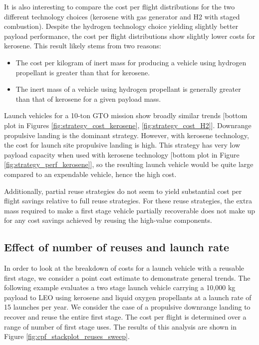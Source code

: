 \documentclass[conf]{new-aiaa}
\begin{document}
\begin{multicols}{2}
It is also interesting to compare the cost per flight distributions for the two different technology choices (kerosene with gas generator and H2 with staged combustion). Despite the hydrogen technology choice yielding slightly better payload performance, the cost per flight distributions show slightly lower costs for kerosene. This result likely stems from two reasons:

\begin{itemize}
  \item The cost per kilogram of inert mass for producing a vehicle using hydrogen propellant is greater than that for kerosene. 
  \item The inert mass of a vehicle using hydrogen propellant is generally greater than that of kerosene for a given payload mass.
\end{itemize}

Launch vehicles for a 10-ton GTO mission show broadly similar trends [bottom plot in Figures \ref{fig:strategy_cost_kerosene}, \ref{fig:strategy_cost_H2}]. Downrange propulsive landing is the dominant strategy. However, with kerosene technology, the cost for launch site propulsive landing is high. This strategy has very low payload capacity when used with kerosene technology [bottom plot in Figure \ref{fig:strategy_perf_kerosene}], so the resulting launch vehicle would be quite large compared to an expendable vehicle, hence the high cost.

Additionally, partial reuse strategies do not seem to yield substantial cost per flight savings relative to full reuse strategies. For these reuse strategies, the extra mass required to make a first stage vehicle partially recoverable does not make up for any cost savings achieved by reusing the high-value components. 


\subsection{Effect of number of reuses and launch rate}
In order to look at the breakdown of costs for a launch vehicle with a reusable first stage, we consider a point cost estimate to demonstrate general trends. The following example evaluates a two stage launch vehicle carrying a 10,000 kg payload to LEO using kerosene and liquid oxygen propellants at a launch rate of 15 launches per year. We consider the case of a propulsive downrange landing to recover and reuse the entire first stage. The cost per flight is determined over a range of number of first stage uses. The results of this analysis are shown in Figure \ref{fig:cpf_stackplot_reuses_sweep}.


\end{multicols}
\end{document}
